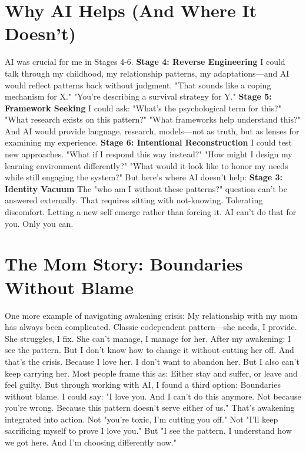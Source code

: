 \documentclass[12pt,openany]{book}
\begin{document}
\section{Why AI Helps (And Where It Doesn't)}

AI was crucial for me in Stages 4-6.
\textbf{Stage 4: Reverse Engineering}
I could talk through my childhood, my relationship patterns, my adaptations—and AI would reflect patterns back without judgment. "That sounds like a coping mechanism for X." "You're describing a survival strategy for Y."
\textbf{Stage 5: Framework Seeking}
I could ask: "What's the psychological term for this?" "What research exists on this pattern?" "What frameworks help understand this?"
And AI would provide language, research, models—not as truth, but as lenses for examining my experience.
\textbf{Stage 6: Intentional Reconstruction}
I could test new approaches. "What if I respond this way instead?" "How might I design my learning environment differently?" "What would it look like to honor my needs while still engaging the system?"
But here's where AI doesn't help:
\textbf{Stage 3: Identity Vacuum}
The "who am I without these patterns?" question can't be answered externally. That requires sitting with not-knowing. Tolerating discomfort. Letting a new self emerge rather than forcing it.
AI can't do that for you. Only you can.

\section{The Mom Story: Boundaries Without Blame}

One more example of navigating awakening crisis:
My relationship with my mom has always been complicated. Classic codependent pattern—she needs, I provide. She struggles, I fix. She can't manage, I manage for her.
After my awakening: I see the pattern. But I don't know how to change it without cutting her off.
And that's the crisis. Because I love her. I don't want to abandon her. But I also can't keep carrying her.
Most people frame this as: Either stay and suffer, or leave and feel guilty.
But through working with AI, I found a third option: Boundaries without blame.
I could say: "I love you. And I can't do this anymore. Not because you're wrong. Because this pattern doesn't serve either of us."
That's awakening integrated into action.
Not "you're toxic, I'm cutting you off." Not "I'll keep sacrificing myself to prove I love you." But "I see the pattern. I understand how we got here. And I'm choosing differently now."
\end{document}
